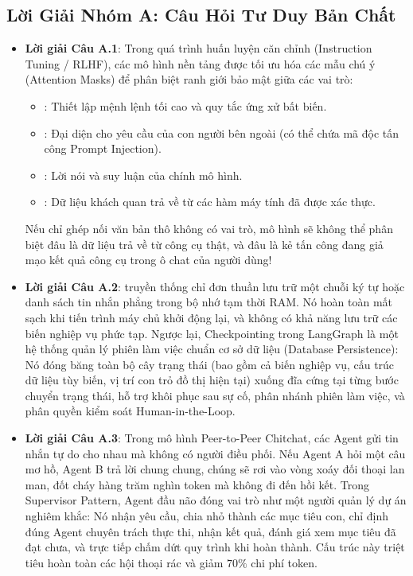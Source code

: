 \subsection{Lời Giải Nhóm A: Câu Hỏi Tư Duy Bản Chất}
\begin{itemize}
  \item \textbf{Lời giải Câu A.1}:
  Trong quá trình huấn luyện căn chỉnh (Instruction Tuning / RLHF), các mô hình nền tảng được tối ưu hóa các mẫu chú ý (Attention Masks) để phân biệt ranh giới bảo mật giữa các vai trò:
  \begin{itemize}
    \item {}: Thiết lập mệnh lệnh tối cao và quy tắc ứng xử bất biến.
    \item {}: Đại diện cho yêu cầu của con người bên ngoài (có thể chứa mã độc tấn công Prompt Injection).
    \item {}: Lời nói và suy luận của chính mô hình.
    \item {}: Dữ liệu khách quan trả về từ các hàm máy tính đã được xác thực.
  \end{itemize}
  Nếu chỉ ghép nối văn bản thô không có vai trò, mô hình sẽ không thể phân biệt đâu là dữ liệu trả về từ công cụ thật, và đâu là kẻ tấn công đang giả mạo kết quả công cụ trong ô chat của người dùng!

  \item \textbf{Lời giải Câu A.2}:
   truyền thống chỉ đơn thuần lưu trữ một chuỗi ký tự hoặc danh sách tin nhắn phẳng trong bộ nhớ tạm thời RAM. Nó hoàn toàn mất sạch khi tiến trình máy chủ khởi động lại, và không có khả năng lưu trữ các biến nghiệp vụ phức tạp.
  Ngược lại, Checkpointing trong LangGraph là một hệ thống quản lý phiên làm việc chuẩn cơ sở dữ liệu (Database Persistence): Nó đóng băng toàn bộ cây trạng thái (bao gồm cả biến nghiệp vụ, cấu trúc dữ liệu tùy biến, vị trí con trỏ đồ thị hiện tại) xuống đĩa cứng tại từng bước chuyển trạng thái, hỗ trợ khôi phục sau sự cố, phân nhánh phiên làm việc, và phân quyền kiểm soát Human-in-the-Loop.

  \item \textbf{Lời giải Câu A.3}:
  Trong mô hình Peer-to-Peer Chitchat, các Agent gửi tin nhắn tự do cho nhau mà không có người điều phối. Nếu Agent A hỏi một câu mơ hồ, Agent B trả lời chung chung, chúng sẽ rơi vào vòng xoáy đối thoại lan man, đốt cháy hàng trăm nghìn token mà không đi đến hồi kết.
  Trong Supervisor Pattern, Agent đầu não đóng vai trò như một người quản lý dự án nghiêm khắc: Nó nhận yêu cầu, chia nhỏ thành các mục tiêu con, chỉ định đúng Agent chuyên trách thực thi, nhận kết quả, đánh giá xem mục tiêu đã đạt chưa, và trực tiếp chấm dứt quy trình khi hoàn thành. Cấu trúc này triệt tiêu hoàn toàn các hội thoại rác và giảm $70\%$ chi phí token.


\end{itemize}
